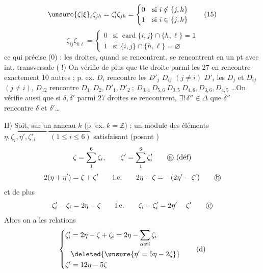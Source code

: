 \[
\unsure{\zeta|\xi}_i\zeta_{jh}=\zeta'_i\zeta_{jh}=
\begin{cases}0&\text{si }i\notin\{j,h\}\\1&\text{si }i\in\{j,h\}\end{cases}\tag*{(15)}
\]
\[
\zeta_{ij}\zeta_{h\ell}=\begin{cases}
0&\text{si }\operatorname{card}\{i,j\}\cap\{h,\ell\}=1\\
1&\text{si }\{i,j\}\cap\{h,\ell\}=\varnothing
\end{cases}\tag*{(16)}
\]
ce qui précise (0) : les  droites, quand   se rencontrent, se rencontrent en  un pt avec int. transversale ( !) On vérifie de plus que tte droite parmi les 27 en rencontre exactement 10 autres ; p. ex. $D_i$ rencontre les $D'_j$   $D_{ij}$ $(j\ne i)$ $D'_i$ les $D_j$ et $D_{ij}$ $(j\ne i)$, $D_{12}$ rencontre $D_1,D_2,D'_1,D'_2\ ;\ D_{3,4}\ D_{5,6}\ D_{3,5}\ D_{4,6},D_{3,6},D_{4,5}$ \ldots On vérifie aussi que si $\delta,\delta'$ parmi   27 droites se rencontrent, $\exists!\,\delta''\in\Delta$   que $\delta''$ rencontre $\delta$ et $\delta'$\ldots

II) Soit, sur un anneau $k$  (p. ex. $k=\mathbb Z$) ; un module   des éléments $\overbrace{\eta,\zeta_i,\eta',\zeta'_i\qquad(1\le i\le6)}$ satisfaisant (posant )
\[
\zeta=\sum_1^6\zeta_i,\qquad\zeta'=\sum_1^6\zeta'_i\tag*{\textcircled{a} (déf)}
\]
\[
2(\eta+\eta')=\zeta+\zeta'\qquad\text{i.e.}\qquad2\eta-\zeta=-(2\eta'-\zeta')\tag*{\textcircled{b}}
\]
et de plus
\[
\zeta'_i-\zeta_i=2\eta-\zeta\qquad\text{i.e.}\qquad\zeta_i-\zeta'_i=2\eta'-\zeta'\tag*{\textcircled{c}}
\]
Alors on a les relations
\[
\left\{\begin{aligned}
\zeta'_i&=2\eta-\zeta+\zeta_i=2\eta-\sum_{\alpha\ne i}\zeta_i\\
&\deleted{\unsure{\eta'=5\eta-2\zeta}}\\
\zeta'&=12\eta-5\zeta
\end{aligned}\right.\tag*{(d)}
\]
 
